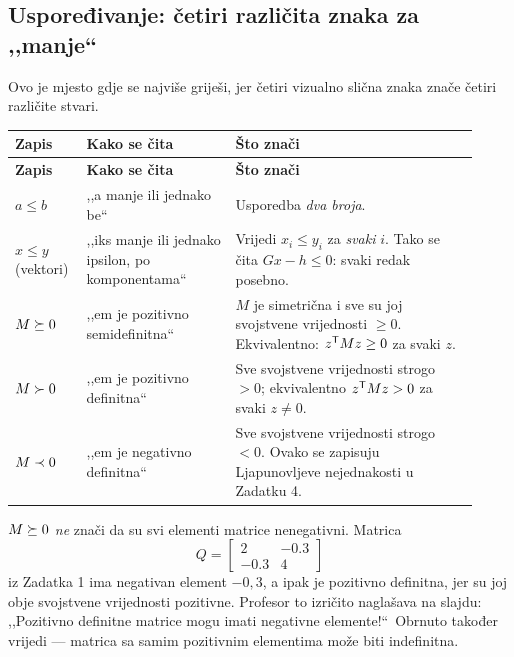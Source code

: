 \subsection{Uspoređivanje: četiri različita znaka za ,,manje``}
\label{sec:relacije}

Ovo je mjesto gdje se najviše griješi, jer četiri vizualno slična znaka znače
četiri različite stvari.

\begin{longtable}{@{}p{0.13\linewidth} p{0.30\linewidth} p{0.49\linewidth}@{}}
\toprule
\textbf{Zapis} & \textbf{Kako se čita} & \textbf{Što znači} \\
\midrule
\endfirsthead
\toprule
\textbf{Zapis} & \textbf{Kako se čita} & \textbf{Što znači} \\
\midrule
\endhead
$a \leq b$ & ,,a manje ili jednako be`` & Usporedba \emph{dva broja}. \\[4pt]
$x \leq y$ (vektori) & ,,iks manje ili jednako ipsilon, po komponentama`` & Vrijedi $x_i \leq y_i$ za \emph{svaki} $i$. Tako se čita $Gx - h \leq 0$: svaki redak posebno. \\[4pt]
$M \succeq 0$ & ,,em je pozitivno semidefinitna`` & $M$ je simetrična i sve su joj svojstvene vrijednosti $\geq 0$. Ekvivalentno: $z^{\mathsf{T}} M z \geq 0$ za svaki $z$. \\[4pt]
$M \succ 0$ & ,,em je pozitivno definitna`` & Sve svojstvene vrijednosti strogo $> 0$; ekvivalentno $z^{\mathsf{T}} M z > 0$ za svaki $z \neq 0$. \\[4pt]
$M \prec 0$ & ,,em je negativno definitna`` & Sve svojstvene vrijednosti strogo $< 0$. Ovako se zapisuju Ljapunovljeve nejednakosti u Zadatku 4. \\
\bottomrule
\end{longtable}

\begin{zamka}
$M \succeq 0$ \emph{ne} znači da su svi elementi matrice nenegativni. Matrica
\[
Q = \begin{bmatrix} 2 & -0.3 \\ -0.3 & 4 \end{bmatrix}
\]
iz Zadatka 1 ima negativan element $-0{,}3$, a ipak je pozitivno definitna, jer
su joj obje svojstvene vrijednosti pozitivne. Profesor to izričito naglašava na
slajdu: ,,Pozitivno definitne matrice mogu imati negativne elemente!``\ Obrnuto
također vrijedi --- matrica sa samim pozitivnim elementima može biti
indefinitna.
\end{zamka}

